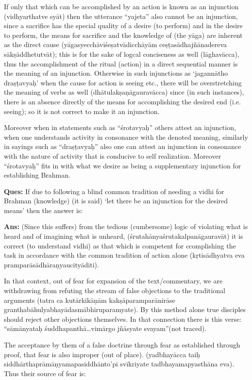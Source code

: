 If only that which can be accomplished by an action is known as an injunction (vidhyarthatve syāt) then the utterance “yajeta” also cannot be an injunction, since a sacrifice has the special quality of a desire (to perform) and in the desire to perform, the means for sacrifice and the knowledge of (the yāga) are inherent as the direct cause (yāgasyecchāviśeṣatvādicchāyām ceṣṭasādhajñānadereva sākṣāddhetutvāt);  this is for the sake of logcal conciseness as well (lāghavācca),  thus the accomplishment of the ritual (action) in a direct sequential manner is the meaning of an injunction. Otherwise in such injunctions as ‘jagannātho draṣṭavyaḥ’ when the cause for action is seeing etc., there will be overstretching the meaning of verbs as well (dhātulakṣaṇāgauravācca) since (in such instances), there is an absence directly of the means for accomplishing the desired end (i.e. seeing); so it is not correct to make it an injunction. 

Moreover when in statements such as “śrotavyaḥ” others attest an injunction, when one understands activity in consonance with the denoted meaning, similarly in sayings such as “draṣṭavyaḥ” also one can attest an injunction in consonance with the nature of activity that is conducive to self realization. Moreover “śrotavyaḥ” fits in with what we desire as being a supplementary injunction for establishing Brahman.

\textbf{Ques:} If due to following a blind common tradition of needing a vidhi for Brahman (knowledge) (it is said) ‘let there be an injunction for the desired means’ then the answer is:

\textbf{Ans:} (Since  this suffers) from the tedious (cumbersome) logic of violating what is heard and of imagining what is unheard, (śrutahānyaśrutakalpanāgauravāt) it is correct  (to understand vidhi) as that which is competent for ccomplishing the task in accordance with the common tradition of action alone (kṛtisādhyatva eva pramparāsādhāraṇyaucityāditi). 

In that context, out of fear for expansion of the text/commentary, we are withdrawing from refuting the stream of false objections to the traditional arguments (tatra ca kutārkikāṇām kakṣāparamparānirāse granthabāhulyabhayādasmābhiruparamyate). By this method alone true disciples should reject other objections themselves. In that connection there is this verse: “sāmānyataḥ śuddhapanthā…vimārgo jñāsyate svayam”(not traced).

The acceptance by them of a false doctrine through fear as established through proof, that fear is also improper (out of place). (yadbhayācca taiḥ siddhārthaprāmāṇyamapasiddhānto’pi svīkriyate tadbhayamapyasthāna eva). Thus their source of fear is: 


